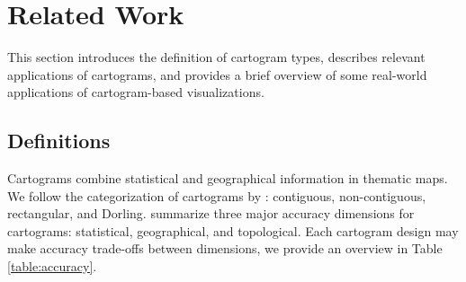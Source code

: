 \section{Related Work}

This section introduces the definition of cartogram types, describes relevant applications of cartograms, and provides a brief overview of some real-world applications of cartogram-based visualizations.

\subsection{Definitions}

Cartograms combine statistical and geographical information in thematic maps. We follow the categorization of cartograms by : contiguous, non-contiguous, rectangular, and Dorling.  summarize three major accuracy dimensions for cartograms: statistical, geographical, and topological. Each cartogram design may make accuracy trade-offs between dimensions, we provide an overview in Table \ref{table:accuracy}.

{
\renewcommand{\arraystretch}{1.5}
\begin{table}[!b]
	\centering
	\caption{\textcolor{Mycolor3}{\textbf{Trade-off between dimensions}}. \textcolor{Mycolor6}{\textbf{Dimension sacrificed}} in order to improve \textcolor{Mycolor5}{\textbf{target dimension}}'s accuracy.}
	\label{table:accuracy}
\end{table}
}


